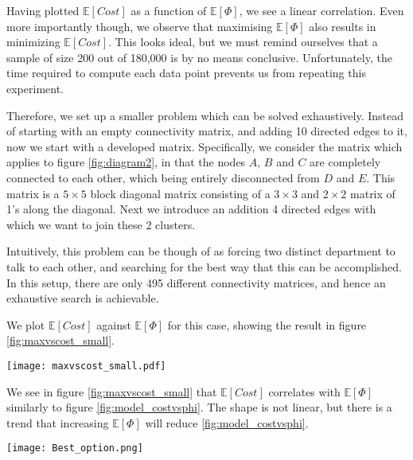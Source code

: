 Having plotted $\mathbb{E}[Cost]$ as a function of $\mathbb{E}[\Phi]$, we see a linear correlation. Even more importantly though, we observe that maximising $\mathbb{E}[\Phi]$ also results in minimizing $\mathbb{E}[Cost]$. This looks ideal, but we must remind ourselves that a sample of size 200 out of 180,000 is by no means conclusive. Unfortunately, the time required to compute each data point prevents us from repeating this experiment. 


Therefore, we set up a smaller problem which can be solved exhaustively. Instead of starting with an empty connectivity matrix, and adding 10 directed edges to it, now we start with a developed matrix. Specifically, we consider the matrix which applies to figure \ref{fig:diagram2}, in that the nodes $A$, $B$ and $C$ are completely connected to each other, which being entirely disconnected from $D$ and $E$. This matrix is a $5\times 5$ block diagonal matrix consisting of a $3 \times 3$ and $2 \times 2$ matrix of 1's along the diagonal. Next we introduce an addition 4 directed edges with which we want to join these 2 clusters.

Intuitively, this problem can be though of as forcing two distinct department to talk to each other, and searching for the best way that this can be accomplished. In this setup, there are only 495 different connectivity matrices, and hence an exhaustive search is achievable.

We plot $\mathbb{E}[Cost]$ against $\mathbb{E}[\Phi]$ for this case, showing the result in figure \ref{fig:maxvscost_small}.

\begin{SCfigure}
	\centering
	\texttt{[image: maxvscost\_small.pdf]}
	\caption{We plot  $\mathbb{E}[Cost]$ against $\mathbb{E}[\Phi]$ for connectivity matrices where we add 4 directed edges to the network shown in figure \ref{fig:diagram2}}
	\label{fig:maxvscost_small}
\end{SCfigure}


We see in figure \ref{fig:maxvscost_small} that $\mathbb{E}[Cost]$ correlates with $\mathbb{E}[\Phi]$ similarly to figure \ref{fig:model_costvsphi}. The shape is not linear, but there is a trend that increasing $\mathbb{E}[\Phi]$ will reduce \ref{fig:model_costvsphi}.

\begin{SCfigure}
	\centering
	\texttt{[image: Best\_option.png]}
	\caption{We show the network which generated both the smallest $\mathbb{E}[Cost]$, and the largest $\mathbb{E}[\Phi]$. The two way link between $B$ and $D$ allows the network to have one combination of teams which can complete the project requiring all skills. The other one way links from $D$ affect results by minimizing duplication of work.}
	\label{fig:opt_network}
\end{SCfigure}

